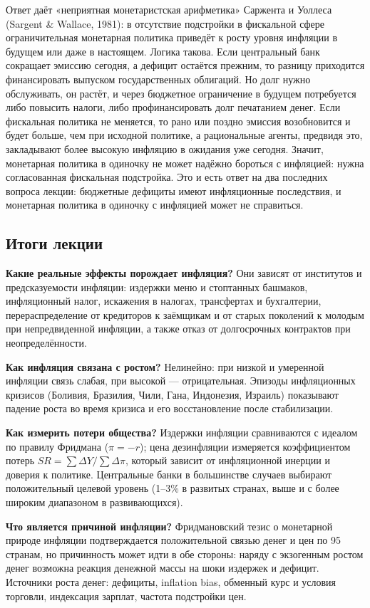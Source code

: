 \documentclass[11pt,a4paper]{article}
\begin{document}
Ответ даёт «неприятная монетаристская арифметика» Саржента и Уоллеса (Sargent \& Wallace, 1981): в отсутствие подстройки в фискальной сфере ограничительная монетарная политика приведёт к росту уровня инфляции в будущем или даже в настоящем. Логика такова. Если центральный банк сокращает эмиссию сегодня, а дефицит остаётся прежним, то разницу приходится финансировать выпуском государственных облигаций. Но долг нужно обслуживать, он растёт, и через бюджетное ограничение в будущем потребуется либо повысить налоги, либо профинансировать долг печатанием денег. Если фискальная политика не меняется, то рано или поздно эмиссия возобновится и будет больше, чем при исходной политике, а рациональные агенты, предвидя это, закладывают более высокую инфляцию в ожидания уже сегодня. Значит, монетарная политика в одиночку не может надёжно бороться с инфляцией: нужна согласованная фискальная подстройка. Это и есть ответ на два последних вопроса лекции: бюджетные дефициты имеют инфляционные последствия, и монетарная политика в одиночку с инфляцией может не справиться.

\subsection{Итоги лекции}

\textbf{Какие реальные эффекты порождает инфляция?} Они зависят от институтов и предсказуемости инфляции: издержки меню и стоптанных башмаков, инфляционный налог, искажения в налогах, трансфертах и бухгалтерии, перераспределение от кредиторов к заёмщикам и от старых поколений к молодым при непредвиденной инфляции, а также отказ от долгосрочных контрактов при неопределённости.

\textbf{Как инфляция связана с ростом?} Нелинейно: при низкой и умеренной инфляции связь слабая, при высокой --- отрицательная. Эпизоды инфляционных кризисов (Боливия, Бразилия, Чили, Гана, Индонезия, Израиль) показывают падение роста во время кризиса и его восстановление после стабилизации.

\textbf{Как измерить потери общества?} Издержки инфляции сравниваются с идеалом по правилу Фридмана ($\pi=-r$); цена дезинфляции измеряется коэффициентом потерь $SR=\sum\Delta Y/\sum\Delta\pi$, который зависит от инфляционной инерции и доверия к политике. Центральные банки в большинстве случаев выбирают положительный целевой уровень (1--3\% в развитых странах, выше и с более широким диапазоном в развивающихся).

\textbf{Что является причиной инфляции?} Фридмановский тезис о монетарной природе инфляции подтверждается положительной связью денег и цен по 95 странам, но причинность может идти в обе стороны: наряду с экзогенным ростом денег возможна реакция денежной массы на шоки издержек и дефицит. Источники роста денег: дефициты, inflation bias, обменный курс и условия торговли, индексация зарплат, частота подстройки цен.
\end{document}

